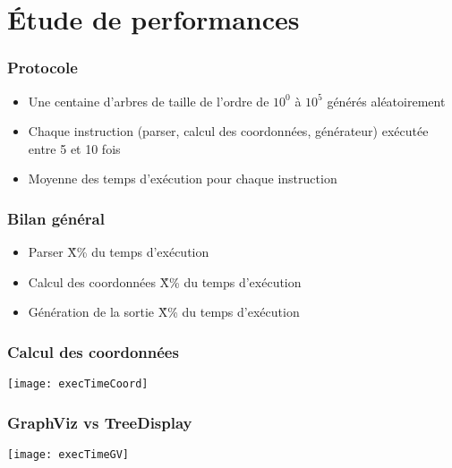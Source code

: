 \section{Étude de performances}

\begin{frame}
	\frametitle{Protocole}
	\begin{itemize}
		\item Une centaine d'arbres de taille de l'ordre de $10^{0}$ à $10^{5}$ générés aléatoirement
		\item Chaque instruction (parser, calcul des coordonnées, générateur) exécutée entre 5 et 10 fois
		\item Moyenne des temps d'exécution pour chaque instruction
	\end{itemize}
\end{frame}

\begin{frame}
	\frametitle{Bilan général}
	\begin{itemize}
		\item Parser \~ X\% du temps d'exécution
		\item Calcul des coordonnées \~ X\% du temps d'exécution
		\item Génération de la sortie \~ X\% du temps d'exécution
	\end{itemize}
\end{frame}

\begin{frame}
	\frametitle{Calcul des coordonnées}
	\begin{center}
	\texttt{[image: execTimeCoord]}
	\end{center}
\end{frame}

\begin{frame}
	\frametitle{GraphViz vs TreeDisplay}
	\begin{center}
	\texttt{[image: execTimeGV]}
	\end{center}
\end{frame}



